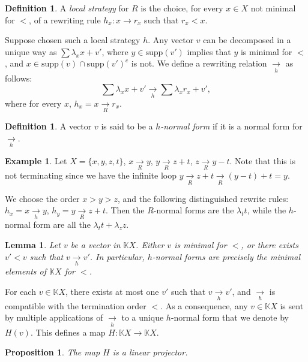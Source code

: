 \documentclass[10pt]{easychair}
\newtheorem{lemma}[theorem]{Lemma}
\newtheorem{proposition}[theorem]{Proposition}
\theoremstyle{definition}
\newtheorem{definition}[theorem]{Definition}
\newtheorem{example}[theorem]{Example}
\newcommand\K{\mathbb{K}}
\newcommand\KX{\K X}
\newcommand\supp{\text{supp}}
\newcommand\rewR{\underset{R}{\longrightarrow}}
\newcommand\rewh{\underset{h}{\longrightarrow}}
\begin{document}
\begin{definition}
A \emph{local strategy} for $R$ is the choice, for every $x\in X$ not minimal for $<$, of a rewriting rule $h_x : x \to r_x$ such that $r_x < x$.
\end{definition}

Suppose chosen such a local strategy $h$. 
Any vector $v$ can be decomposed in a unique way as
$\sum\lambda_xx+v'$, where $y\in\supp(v')$ implies that $y$ is minimal
for $<$, and $x\in\supp(v)\cap\supp(v')^c$ is not. We define a rewriting
relation $\rewh$ as follows:
\begin{equation}\label{equ:well-formed_rewriting_step}
  \sum\lambda_xx+v'\rewh\sum\lambda_xr_x+v',
\end{equation}
where for every $x$, $h_x=x \rewR r_x$.

\medskip

\begin{definition}
  A vector $v$ is said to be a \emph{$h$-normal form} if it is a normal
  form for $\rewh$.
\end{definition}


\begin{example}\label{ex:h_norma_form}
Let $X=\{x,y,z,t\}$, $x\rewR y$, $y \rewR z + t$, $z \rewR y - t$. Note that this is not terminating since we have the infinite loop $y \rewR z + t \rewR (y - t) + t = y$.

We choose the order $x > y > z$, and the following distinguished rewrite rules: $h_x = x \rewh y$, $h_y = y \rewR z + t$. Then the $R$-normal forms are the $\lambda_t t$, while the $h$-normal form are all the $\lambda_t t + \lambda_z z$.
\end{example}


\begin{lemma}\label{lem:h_normal_forms}
  Let $v$ be a vector in $\KX$. Either $v$ is minimal for $<$, or there exists $v'<v$ such that $v\rewh v'$. In particular, $h$-normal forms are
  precisely the minimal elements of $\KX$ for $<$. 
\end{lemma}

\medskip

For each $v\in\KX$, there exists at most one $v'$ such that $v \rewh v'$,
and $\rewh$ is compatible with the termination order $<$. As a
consequence, any $v \in \KX$ is sent by multiple applications of $\rewh$
to a unique $h$-normal form that we denote by $H(v)$. This defines a map
$H : \KX \to \KX$.  

\begin{proposition}\label{prop:linearity_of_H}
  The map $H$ is a linear projector.
\end{proposition}
\end{document}
